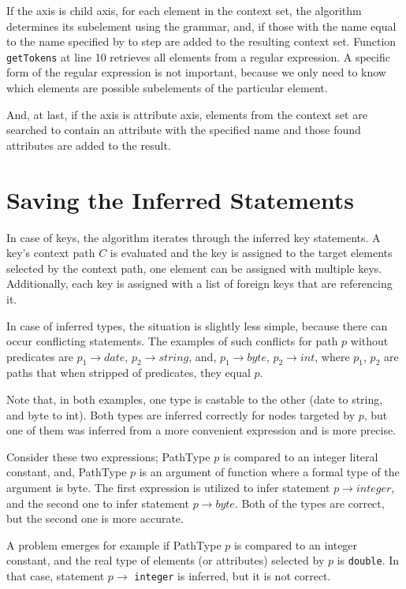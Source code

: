 If the axis is child axis, for each element in the context set, the algorithm determines its subelement using the grammar, and, if those with the name equal to the name specified by to step are added to the resulting context set. Function \texttt{getTokens} at line 10 retrieves all elements from a regular expression. A specific form of the regular expression is not important, because we only need to know which elements are possible subelements of the particular element.

And, at last, if the axis is attribute axis, elements from the context set are searched to contain an attribute with the specified name and those found attributes are added to the result.

\section{Saving the Inferred Statements}
In case of keys, the algorithm iterates through the inferred key statements. A key's context path $C$ is evaluated and the key is assigned to the target elements selected by the context path, one element can be assigned with multiple keys. Additionally, each key is assigned with a list of foreign keys that are referencing it.

In case of inferred types, the situation is slightly less simple, because there can occur conflicting statements. The examples of such conflicts for path $p$ without predicates are $p_1 \rightarrow date$, $p_2 \rightarrow string$, and, $p_1 \rightarrow byte$, $p_2 \rightarrow int$, where $p_1$, $p_2$ are paths that when stripped of predicates, they equal $p$.

Note that, in both examples, one type is castable to the other (date to string, and byte to int). Both types are inferred correctly for nodes targeted by $p$, but one of them was inferred from a more convenient expression and is more precise.

Consider these two expressions; PathType $p$ is compared to an integer literal constant, and, PathType $p$ is an argument of function where a formal type of the argument is byte. The first expression is utilized to infer statement $p \rightarrow integer$, and the second one to infer statement $p \rightarrow byte$. Both of the types are correct, but the second one is more accurate.

A problem emerges for example if PathType $p$ is compared to an integer constant, and the real type of elements (or attributes) selected by $p$ is \texttt{double}. In that case, statement $p \rightarrow$ \texttt{integer} is inferred, but it is not correct.

